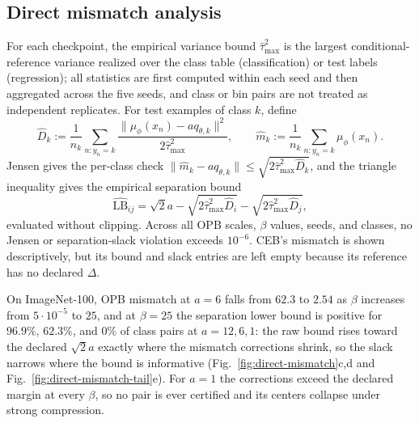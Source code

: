 \subsection{Direct mismatch analysis}
\label{sec:direct-mismatch}
For each checkpoint, the empirical variance bound $\widehat\tau^2_{\max}$ is the
largest conditional-reference variance realized over the class table
(classification) or test labels (regression); all statistics are first computed
within each seed and then aggregated across the five seeds, and class or bin pairs
are not treated as independent replicates. For test examples of class $k$, define
\begin{equation}
\widehat D_k:=\frac{1}{n_k}\sum_{n:y_n=k}
\frac{\|\mu_\phi(x_n)-a q_{\theta,k}\|^2}{2\widehat\tau^2_{\max}},
\qquad
\widehat m_k:=\frac{1}{n_k}\sum_{n:y_n=k}\mu_\phi(x_n).
\label{eq:empirical-class-mismatch}
\end{equation}
Jensen gives the per-class check
$\|\widehat m_k-aq_{\theta,k}\|
\le\sqrt{2\widehat\tau^2_{\max}\widehat D_k}$, and the triangle inequality gives the
empirical separation bound
\begin{equation}
\widehat{\mathrm{LB}}_{ij}=\sqrt{2}a
-\sqrt{2\widehat\tau^2_{\max}\widehat D_i}
-\sqrt{2\widehat\tau^2_{\max}\widehat D_j},
\label{eq:empirical-class-separation-bound}
\end{equation}
evaluated without clipping. Across all OPB scales, $\beta$ values, seeds, and
classes, no Jensen or separation-slack violation exceeds $10^{-6}$. CEB's mismatch is
shown descriptively, but its bound and slack entries are left empty because its
reference has no declared $\Delta$.

On ImageNet-100, OPB mismatch at
$a=6$ falls from $62.3$ to $2.54$ as $\beta$ increases from $5\cdot10^{-5}$ to $25$,
and at $\beta=25$ the separation lower bound is positive for $96.9\%$, $62.3\%$, and
$0\%$ of class pairs at $a=12,6,1$: the raw bound rises toward the declared
$\sqrt2a$ exactly where the mismatch corrections shrink, so the slack narrows where
the bound is informative (Fig.~\ref{fig:direct-mismatch}c,d and Fig.~\ref{fig:direct-mismatch-tail}e). For $a=1$ the
corrections exceed the declared margin at every $\beta$, so no pair is ever certified
and its centers collapse under strong compression.

